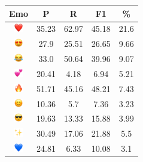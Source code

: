 \documentclass{article}
\begin{document}
\begin{table}
\centering
\begin{tabular}{|c|ccc|c|} \hline
\textbf{Emo} & \textbf{P} & \textbf{R} & \textbf{F1} & \textbf{\%} \\ \hline
\includegraphics[height=0.37cm,width=0.37cm]{img/red_heart.png} & 35.23 & 62.97 & 45.18 & 21.6\\ 
\includegraphics[height=0.37cm,width=0.37cm]{img/smiling_face_with_hearteyes.png} & 27.9 & 25.51 & 26.65 & 9.66\\ 
\includegraphics[height=0.37cm,width=0.37cm]{img/face_with_tears_of_joy.png} & 33.0 & 50.64 & 39.96 & 9.07\\ 
\includegraphics[height=0.37cm,width=0.37cm]{img/two_hearts.png} & 20.41 & 4.18 & 6.94 & 5.21\\ 
\includegraphics[height=0.37cm,width=0.37cm]{img/fire.png} & 51.71 & 45.16 & 48.21 & 7.43\\ 
\includegraphics[height=0.37cm,width=0.37cm]{img/smiling_face_with_smiling_eyes.png} & 10.36 & 5.7 & 7.36 & 3.23\\ 
\includegraphics[height=0.37cm,width=0.37cm]{img/smiling_face_with_sunglasses.png} & 19.63 & 13.33 & 15.88 & 3.99\\ 
\includegraphics[height=0.37cm,width=0.37cm]{img/sparkles.png} & 30.49 & 17.06 & 21.88 & 5.5\\ 
\includegraphics[height=0.37cm,width=0.37cm]{img/blue_heart.png} & 24.81 & 6.33 & 10.08 & 3.1\\ 

\end{tabular}
\end{table}
\end{document}
